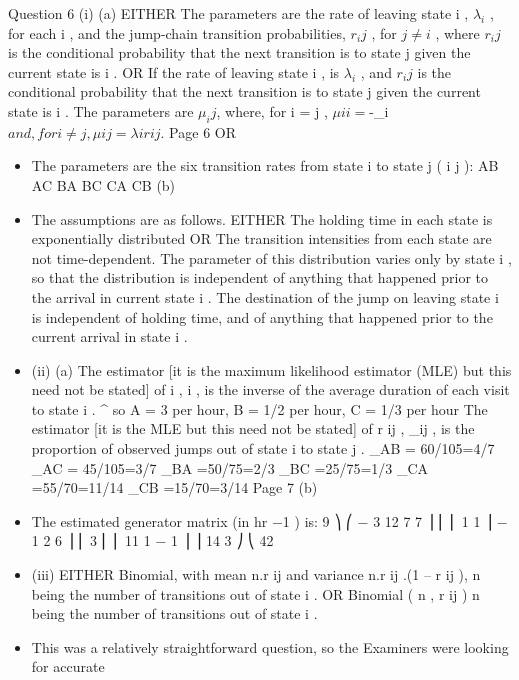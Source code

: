 \documentclass[a4paper,12pt]{article}
\begin{document}
Question 6
(i)
(a)
EITHER
The parameters are the rate of leaving state i , $\lambda_i$ , for each i , and the jump-chain
transition probabilities, $r_ij$ , for $j \neq i$ , where $r_ij$ is the conditional probability that
the next transition is to state j given the current state is i .
OR
If the rate of leaving state i , is $\lambda_i$ , and $r_ij$ is the conditional probability that the
next transition is to state j given the current state is i .
The parameters are $\mu_ij$, where, for i = j , $ \mu ii = $-\lambda_i$ and, for i \neq j , \mu ij = \lambda i r ij .$
Page 6%
OR
\begin{itemize}
\item The parameters are the six transition rates from state i to state j ( i \neq j ):
\mu AB
\mu AC
\mu BA
\mu BC
\mu CA
\mu CB
(b)
\item The assumptions are as follows.
EITHER The holding time in each state is exponentially distributed
OR The transition intensities from each state are not time-dependent.
The parameter of this distribution varies only by state i , so that the distribution
is independent of anything that happened prior to the arrival in current state i .
The destination of the jump on leaving state i is independent of holding time,
and of anything that happened prior to the current arrival in state i .
\item (ii)
(a)
The estimator [it is the maximum likelihood estimator (MLE)
but this need not be stated] of \lambda i , \hat{\lambda} i , is the inverse of the
average duration of each visit to state i .
^
so \hat{\lambda} A = 3 per hour, \hat{\lambda} B = 1/2 per hour, \lambda C = 1/3 per hour
The estimator [it is the MLE but this need not be stated]
of r ij , _ij , is the proportion of observed jumps out of
state i to state j .
_AB = 60/105=4/7
_AC = 45/105=3/7
_BA =50/75=2/3
_BC =25/75=1/3
_CA =55/70=11/14
_CB =15/70=3/14
Page 7%
(b)
\item The estimated generator matrix (in hr −1 ) is:
9 ⎞
⎛ − 3 12
7
7 ⎟
⎜
⎜ 1
1 ⎟
− 1
2
6 ⎟
⎜ 3
⎜ ⎜ 11
1
− 1 ⎟ ⎟
14
3 ⎠
⎝ 42
\item (iii)
EITHER Binomial, with mean n.r ij and variance n.r ij .(1 – r ij ), n being the number of
transitions out of state i .
OR Binomial ( n , r ij ) n being the number of transitions out of state i .
\item This was a relatively straightforward question, so the Examiners were looking for accurate

\end{itemize}
\end{document}
